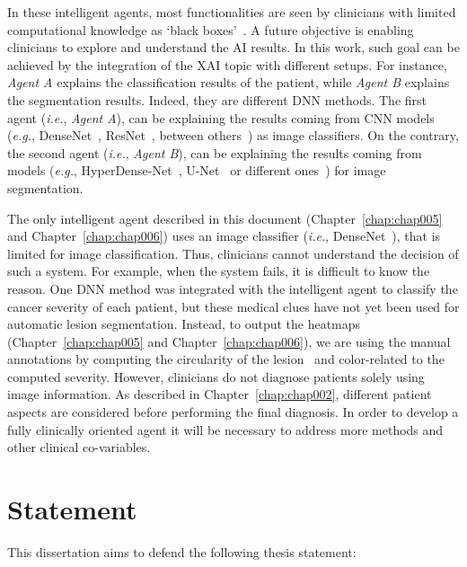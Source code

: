 In these intelligent agents, most functionalities are seen by clinicians with limited computational knowledge as `black boxes'~\cite{10.1145/3313831.3376807}.
A future objective is enabling clinicians to explore and understand the \ac{AI} results.
In this work, such goal can be achieved by the integration of the \ac{XAI} topic with different setups.
For instance, {\it Agent A} explains the classification results of the patient, while {\it Agent B} explains the segmentation results.
Indeed, they are different \ac{DNN} methods.
The first agent ({\it i.e.}, {\it Agent A}), can be explaining the results coming from \ac{CNN} models ({\it e.g.}, DenseNet~\cite{Huang_2017_CVPR}, ResNet~\cite{He_2016_CVPR}, between others~\cite{10.1117/12.2549103}) as image classifiers.
On the contrary, the second agent ({\it i.e.}, {\it Agent B}), can be explaining the results coming from models ({\it e.g.}, HyperDense-Net~\cite{8515234}, U-Net~\cite{10.1007/978-3-319-24574-4_28} or different ones~\cite{10.1007/978-3-030-46640-4_23}) for image segmentation.

The only intelligent agent described in this document (Chapter~\ref{chap:chap005} and Chapter~\ref{chap:chap006}) uses an image classifier ({\it i.e.}, DenseNet~\cite{Huang_2017_CVPR}), that is limited for image classification.
Thus, clinicians cannot understand the decision of such a system.
For example, when the system fails, it is difficult to know the reason.
One \ac{DNN} method was integrated with the intelligent agent to classify the cancer severity of each patient, but these medical clues have not yet been used for automatic lesion segmentation.
Instead, to output the heatmaps (Chapter~\ref{chap:chap005} and Chapter~\ref{chap:chap006}), we are using the manual annotations by computing the circularity of the lesion~\cite{DALILA2017749} and color-related to the computed severity.
However, clinicians do not diagnose patients solely using image information.
As described in Chapter~\ref{chap:chap002}, different patient aspects are considered before performing the final diagnosis.
In order to develop a fully clinically oriented agent it will be necessary to address more methods and other clinical co-variables.

\section{Statement }
\label{sec:sec001005}

This dissertation aims to defend the following thesis statement:

